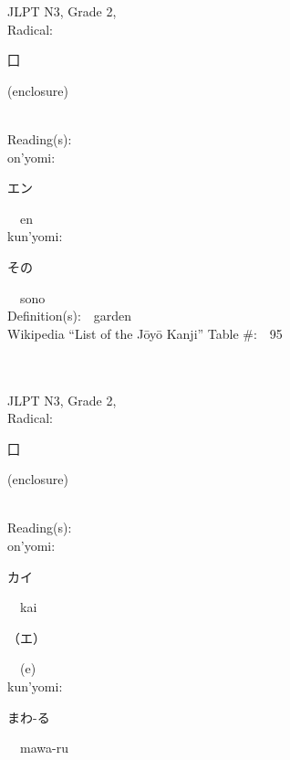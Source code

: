 \begin{multicols}{2}
{JLPT N3, Grade 2, \\Radical:\ \ {\begin{CJK}{UTF8}{min} 囗 \end{CJK}} (enclosure) } \\
Reading(s):\ \ \\
{\hspace*{1em}}on'yomi:\ \ \\
{\hspace*{2em}}{\begin{CJK}{UTF8}{min} エン \end{CJK}}\ \ en\ \ \\
{\hspace*{1em}}kun'yomi:\ \ \\
{\hspace*{2em}}{\begin{CJK}{UTF8}{min} その \end{CJK}}\ \ sono\ \ \\
Definition(s):\ \ garden \\
Wikipedia ``List of the J\=oy\=o Kanji'' Table \#:\ \ 95 \\
\ \ \\
{\fontsize{34pt}{40pt}  }\ \ \\  %
{JLPT N3, Grade 2, \\Radical:\ \ {\begin{CJK}{UTF8}{min} 囗 \end{CJK}} (enclosure) } \\
Reading(s):\ \ \\
{\hspace*{1em}}on'yomi:\ \ \\
{\hspace*{2em}}{\begin{CJK}{UTF8}{min} カイ \end{CJK}}\ \ kai\ \ \\
{\hspace*{2em}}{\begin{CJK}{UTF8}{min} （エ） \end{CJK}}\ \ (e)\ \ \\
{\hspace*{1em}}kun'yomi:\ \ \\
{\hspace*{2em}}{\begin{CJK}{UTF8}{min} まわ-る \end{CJK}}\ \ mawa-ru\ \ \\

\end{multicols}
